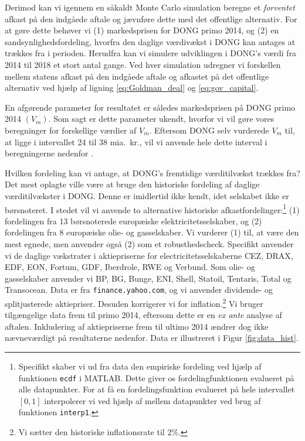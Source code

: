\documentclass{article}
\begin{document}
Derimod kan vi igennem en såkaldt Monte Carlo simulation beregne et \emph{forventet} afkast på den indgåede aftale og jævnføre dette med det offentlige alternativ. For at gøre dette behøver vi (1) markedsprisen for DONG primo 2014, og (2) en sandsynlighedsfordeling, hvorfra den daglige værdivækst i DONG kan antages at trækkes fra i perioden. Herudfra kan vi simulere udviklingen i DONG's værdi fra 2014 til 2018 et stort antal gange. Ved hver simulation udregner vi forskellen mellem statens afkast på den indgåede aftale og afkastet på det offentlige alternativ ved hjælp af ligning \eqref{eq:Goldman_deal} og \eqref{eq:gov_capital}.

En afgørende parameter for resultatet er således markedsprisen på DONG primo 2014 $(V_m)$. Som sagt er dette parameter ukendt, hvorfor vi vil gøre vores beregninger for forskellige værdier af $V_m$. Eftersom DONG selv vurderede $V_m$ til, at ligge i intervallet 24 til 38 mia.\ kr., vil vi anvende hele dette interval i beregningerne nedenfor \citep{DONG2015b}.

Hvilken fordeling kan vi antage, at DONG's fremtidige værditilvækst trækkes fra? Det mest oplagte ville være at bruge den historiske fordeling af daglige værditilvækster i DONG. Denne er imidlertid ikke kendt, idet selskabet ikke er børsnoteret. I stedet vil vi anvende to alternative historiske afkastfordelinger:\footnote{Specifikt skaber vi ud fra data den empiriske fordeling ved hjælp af funktionen \texttt{ecdf} i MATLAB. Dette giver os fordelingfunktionen evalueret på alle datapunkter. For at få en fordelingsfunktion evalueret på hele intervallet $[0,1]$ interpolerer vi ved hjælp af mellem datapunkter ved brug af funktionen \texttt{interp1}.} (1)  fordelingen fra 13 børsnoterede europæiske elektricitetsselskaber, og (2) fordelingen fra 8 europæiske olie- og gasselskaber. Vi vurderer (1) til, at være den mest egnede, men anvender også (2) som et robusthedscheck. Specifikt anvender vi de daglige vækstrater i aktiepriserne for electricitetsselskaberne CEZ, DRAX, EDF, EON, Fortum, GDF, Iberdrole, RWE og Verbund. Som olie- og gasselskaber anvender vi BP, BG, Bunge, ENI, Shell, Statoil, Tentaris, Total og Transocean. Data er fra \texttt{finance.yahoo.com}, og vi anvender dividende- og splitjusterede aktiepriser. Desuden korrigerer vi for inflation.\footnote{Vi sætter den historiske inflationsrate til 2\%.} Vi bruger tilgængelige data frem til primo 2014, eftersom dette er en \emph{ex ante} analyse af aftalen. Inkludering af aktiepriserne frem til ultimo 2014 ændrer dog ikke nævneværdigt på resultaterne nedenfor. Data er illustreret i Figur \ref{fig:data_hist}.
\end{document}
